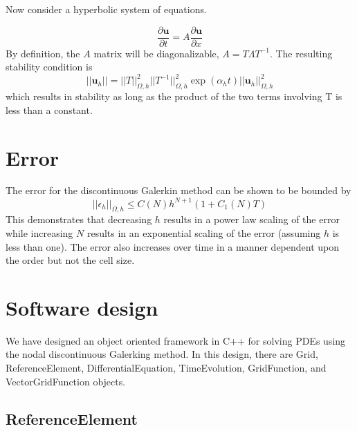 \documentclass{article}
\begin{document}
Now consider a hyperbolic system of equations.

\begin{equation}
\frac{\partial \boldsymbol{u}}{\partial t}=A\frac{\partial \boldsymbol{u}}{\partial x}
\end{equation}
By definition, the $A$ matrix will be diagonalizable, $A=T\Lambda T^{-1}$. The resulting stability condition is
\begin{equation}
||\boldsymbol{u}_h||=||T||^2_{\Omega,h}||T^{-1}||^2_{\Omega,h}\exp(\alpha_h t)
||\boldsymbol{u}_h||^2_{\Omega,h}
\end{equation}
which results in stability as long as the product of the two terms
involving T is less than a constant.


\section{Error}
The error for the discontinuous Galerkin method can be shown to be bounded by 
\begin{equation}
||\epsilon_h||_{\Omega,h}\le C(N)h^{N+1}(1+C_1(N)T)
\end{equation}
This demonstrates that decreasing $h$ results in a power law scaling
of the error while increasing $N$ results in an exponential scaling of
the error (assuming $h$ is less than one). The error also increases
over time in a manner dependent upon the order but not the cell size.


\section{Software design}


We have designed an object oriented framework in C++ for solving PDEs
using the nodal discontinuous Galerking method. In this design, there
are Grid, ReferenceElement, DifferentialEquation, TimeEvolution,
GridFunction, and VectorGridFunction objects. 

\subsection{ReferenceElement}
\end{document}
